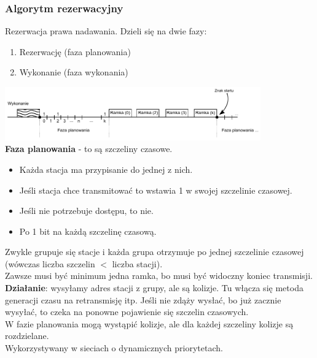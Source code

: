 \documentclass[a4paper,twoside]{article}
\begin{document}
		\subsubsection{Algorytm rezerwacyjny}
			Rezerwacja prawa nadawania. Dzieli się na dwie fazy:
			\begin{enumerate}
				\item Rezerwację (faza planowania)
				\item Wykonanie (faza wykonania)
			\end{enumerate}
			\includegraphics[width=11cm]{./images/image25.pdf}\\
			\textbf{Faza planowania} - to są szczeliny czasowe.
			\begin{itemize}
				\item Każda stacja ma przypisanie do jednej z nich.
				\item Jeśli stacja chce transmitować to wstawia 1 w swojej szczelinie czasowej.
				\item Jeśli nie potrzebuje dostępu, to nie.
				\item Po 1 bit na każdą szczelinę czasową.
			\end{itemize}
			Zwykle grupuje się stacje i każda grupa otrzymuje po jednej szczelinie czasowej (wówczas liczba szczelin $ < $ liczba stacji).\\
			Zawsze musi być minimum jedna ramka, bo musi być widoczny koniec transmisji.\\
			\textbf{Działanie}: wysyłamy adres stacji z grupy, ale są kolizje. Tu włącza się metoda generacji czasu na retransmisję itp. Jeśli nie zdąży wysłać, bo już zacznie wysyłać, to czeka na ponowne pojawienie się szczelin czasowych.\\
			W fazie planowania mogą wystąpić kolizje, ale dla każdej szczeliny kolizje są rozdzielane.\\
			Wykorzystywany w sieciach o dynamicznych priorytetach.
\end{document}

